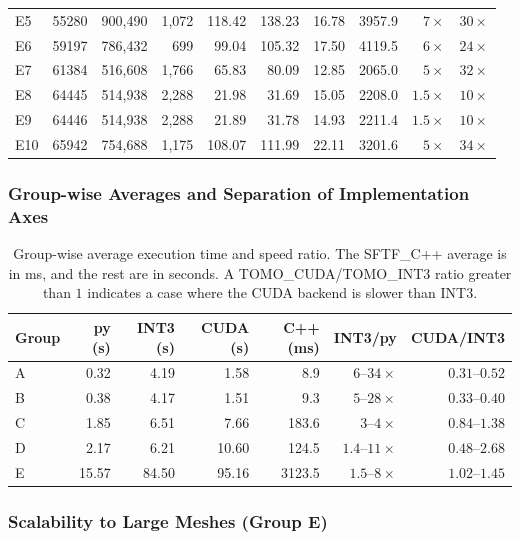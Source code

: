 \documentclass[11pt,a4paper]{article}
\begin{document}
\begin{table}[H]
{\begin{tabular}{llrrrrrrrr}
E5  & 55280 & 900{,}490   & 1{,}072 & 118.42 & 138.23 & 16.78 & 3957.9 & $7\times$   & $30\times$\\
E6  & 59197 & 786{,}432   & 699   & 99.04  & 105.32 & 17.50 & 4119.5 & $6\times$   & $24\times$\\
E7  & 61384 & 516{,}608   & 1{,}766 & 65.83  & 80.09  & 12.85 & 2065.0 & $5\times$   & $32\times$\\
E8  & 64445 & 514{,}938   & 2{,}288 & 21.98  & 31.69  & 15.05 & 2208.0 & $1.5\times$ & $10\times$\\
E9  & 64446 & 514{,}938   & 2{,}288 & 21.89  & 31.78  & 14.93 & 2211.4 & $1.5\times$ & $10\times$\\
E10 & 65942 & 754{,}688   & 1{,}175 & 108.07 & 111.99 & 22.11 & 3201.6 & $5\times$   & $34\times$\\
\bottomrule
\end{tabular}
}
\end{table}

\subsubsection{Group-wise Averages and Separation of Implementation Axes}
\label{sec:impl-compare}

\begin{table}[H]
\footnotesize
\centering
\caption{Group-wise average execution time and speed ratio.
The SFTF\_C++ average is in ms, and the rest are in seconds.
A TOMO\_CUDA/TOMO\_INT3 ratio greater than $1$ indicates a case where the CUDA backend is slower than INT3.}
\label{tab:fivegroup-impl}
\begin{tabular}{lrrrrrr}
\toprule
Group & py (s) & INT3 (s) & CUDA (s) & C++ (ms) & INT3/py & CUDA/INT3\\
\midrule
A & 0.32 & 4.19  & 1.58  & 8.9    & $6$--$34\times$   & $0.31$--$0.52$\\
B & 0.38 & 4.17  & 1.51  & 9.3    & $5$--$28\times$   & $0.33$--$0.40$\\
C & 1.85 & 6.51  & 7.66  & 183.6  & $3$--$4\times$    & $0.84$--$1.38$\\
D & 2.17 & 6.21  & 10.60 & 124.5  & $1.4$--$11\times$ & $0.48$--$2.68$\\
E & 15.57 & 84.50 & 95.16 & 3123.5 & $1.5$--$8\times$  & $1.02$--$1.45$\\
\bottomrule
\end{tabular}
\end{table}

\subsubsection{Scalability to Large Meshes (Group E)}
\label{sec:groupE}
\end{document}
